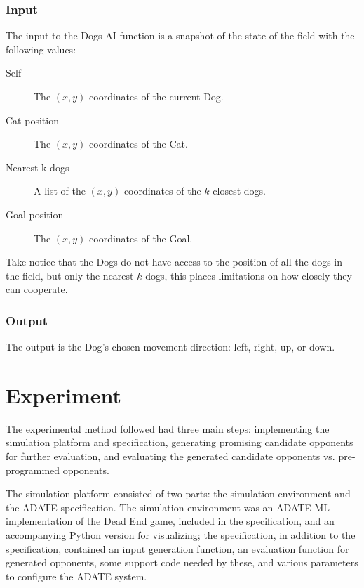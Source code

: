\subsubsection{Input}
\label{sec:input}

The input to the Dogs AI function is a snapshot of the state of the field with
the following values:

\begin{description}
\item[Self] The \((x,y)\) coordinates of the current Dog.
\item[Cat position] The \((x,y)\) coordinates of the Cat.
\item[Nearest k dogs] A list of the \((x,y)\) coordinates of the \(k\) closest
  dogs.
\item[Goal position] The \((x,y)\) coordinates of the Goal.
\end{description}

Take notice that the Dogs do not have access to the position of all the dogs in
the field, but only the nearest \(k\) dogs, this places limitations on how
closely they can cooperate.

\subsubsection{Output}
\label{sec:output}

The output is the Dog's chosen movement direction: left, right, up, or down.


\section{Experiment}
\label{sec:experiment}

The experimental method followed had three main steps: implementing the
simulation platform and specification, generating promising candidate opponents
for further evaluation,
and evaluating the generated candidate opponents vs. pre-programmed opponents.

The simulation platform consisted of two parts: the simulation environment and
the ADATE specification. The simulation environment was an ADATE-ML
implementation of the Dead End game, included in the specification, and an
accompanying Python version for visualizing; the specification, in addition to
the specification, contained an input generation function, an evaluation
function for generated opponents, some support code needed by these, and various
parameters to configure the ADATE system.

